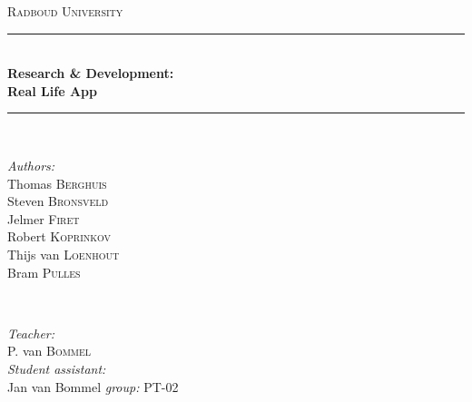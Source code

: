\documentclass[main.tex]{subfiles}
\begin{document}
\begin{titlepage}
    \newcommand{\HRule}{\rule{\linewidth}{0.5mm}} 

    \center 
    \textsc{\LARGE Radboud University}\\[0.5cm] 

    \HRule \\[0.4cm]
        {\huge \bfseries Research \& Development:\\ Real Life App}\\[0.3cm] 
    \HRule \\[1.5cm]

    \begin{figure}[ht]
     	\centering
    \end{figure}

    \begin{minipage}{0.4\textwidth}
        \begin{flushleft} \large
            \emph{Authors:}\\
            Thomas \textsc{Berghuis} \\
            Steven \textsc{Bronsveld} \\
            Jelmer \textsc{Firet} \\
            Robert \textsc{Koprinkov} \\
            Thijs van \textsc{Loenhout} \\
            Bram \textsc{Pulles} \\
        \end{flushleft}
    \end{minipage}
    ~
    \begin{minipage}{0.4\textwidth}
        \begin{flushright} \large
            \emph{Teacher:} \\
            P. van \textsc{Bommel} \\
            \emph{Student assistant:} \\
            Jan van Bommel 
            \emph{group:}
            PT-02
        \end{flushright}
    \end{minipage}\\[2cm]

    \vfill 

\end{titlepage}
\end{document}
